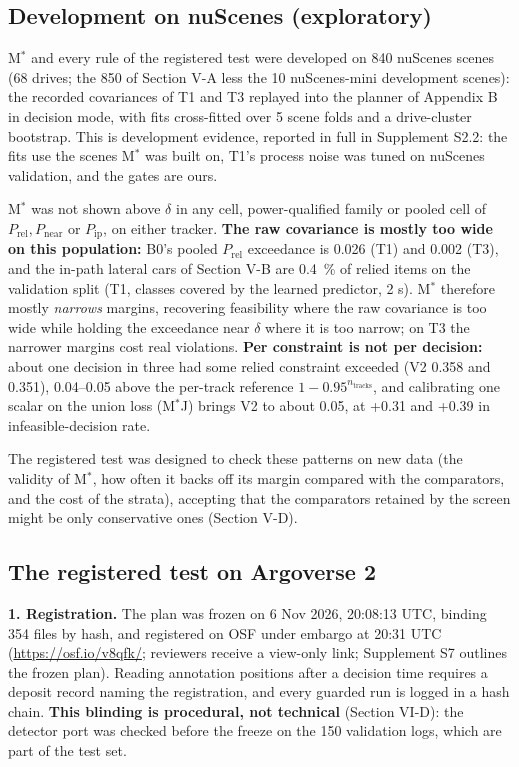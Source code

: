 \documentclass{ieeeaccess}
\begin{document}
\subsection{Development on nuScenes (exploratory)}
M$^{*}$ and every rule of the registered test were developed on 840 nuScenes scenes (68 drives; the 850 of Section V-A less the 10 nuScenes-mini development scenes): the recorded covariances of T1 and T3 replayed into the planner of Appendix B in decision mode, with fits cross-fitted over 5 scene folds and a drive-cluster bootstrap. This is development evidence, reported in full in Supplement S2.2: the fits use the scenes M$^{*}$ was built on, T1's process noise was tuned on nuScenes validation, and the gates are ours.

M$^{*}$ was not shown above $\delta$ in any cell, power-qualified family or pooled cell of $P_{\mathrm{rel}}, P_{\mathrm{near}}$ or $P_{\mathrm{ip}}$, on either tracker. \textbf{The raw covariance is mostly too wide on this population:} B0's pooled $P_{\mathrm{rel}}$ exceedance is 0.026 (T1) and 0.002 (T3), and the in-path lateral cars of Section V-B are 0.4~\% of relied items on the validation split (T1, classes covered by the learned predictor, 2 s). M$^{*}$ therefore mostly \emph{narrows} margins, recovering feasibility where the raw covariance is too wide while holding the exceedance near $\delta$ where it is too narrow; on T3 the narrower margins cost real violations. \textbf{Per constraint is not per decision:} about one decision in three had some relied constraint exceeded (V2 0.358 and 0.351), 0.04--0.05 above the per-track reference $1 - 0.95^{n_{\mathrm{tracks}}}$, and calibrating one scalar on the union loss (M$^{*}$J) brings V2 to about 0.05, at +0.31 and +0.39 in infeasible-decision rate.

The registered test was designed to check these patterns on new data (the validity of M$^{*}$, how often it backs off its margin compared with the comparators, and the cost of the strata), accepting that the comparators retained by the screen might be only conservative ones (Section V-D).

\subsection{The registered test on Argoverse 2}
\textbf{1. Registration.} The plan was frozen on 6 Nov 2026, 20:08:13 UTC, binding 354 files by hash, and registered on OSF under embargo at 20:31 UTC (\url{https://osf.io/v8qfk/}; reviewers receive a view-only link; Supplement S7 outlines the frozen plan). Reading annotation positions after a decision time requires a deposit record naming the registration, and every guarded run is logged in a hash chain. \textbf{This blinding is procedural, not technical} (Section VI-D): the detector port was checked before the freeze on the 150 validation logs, which are part of the test set.
\end{document}
